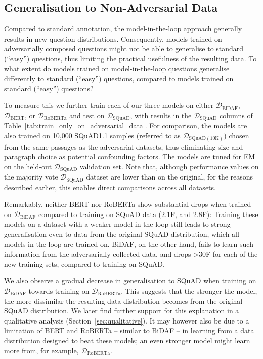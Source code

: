\documentclass[11pt,a4paper]{article}
\newcommand{\dataset}[1]{\ensuremath{\mathcal{D_{\mathrm{#1}}}}}
\newcommand{\squad}{SQuAD}
\newcommand{\squadone}{SQuAD1.1}
\newif\ifpagebreaks
\begin{document}
\subsection{Generalisation to Non-Adversarial Data}
Compared to standard annotation, the model-in-the-loop approach generally results in new question distributions.
Consequently, models trained on adversarially composed questions might not be able to generalise to standard (``easy'') questions, thus limiting the practical usefulness of the resulting data.
To what extent do models trained on model-in-the-loop questions generalise differently to standard (``easy'') questions, compared to models trained on standard (``easy'') questions?


\ifpagebreaks
    \pagebreak
\fi
To measure this we further train each of our three models on either \dataset{BiDAF}, \dataset{BERT}, or \dataset{RoBERTa} and test on \dataset{SQuAD}, with results in the \dataset{SQuAD} columns of Table~\ref{tab:train_only_on_adversarial_data}.
For comparison, the models are also trained on 10,000 \squadone{} samples (referred to as \dataset{SQuAD(10K)}) chosen from the same passages as the adversarial datasets, thus eliminating size and paragraph choice as potential confounding factors.
The models are tuned for EM on the held-out \dataset{SQuAD} validation set. 
Note that, although performance values on the majority vote \dataset{SQuAD} dataset are lower than on the original, for the reasons described earlier, this enables direct comparisons across all datasets.


Remarkably, neither BERT nor RoBERTa show substantial drops when trained on \dataset{BiDAF} compared to training on \squad{} data (2.1F, and 2.8F):
Training these models on a dataset with a weaker model in the loop still leads to strong generalisation even to data from the original \squad{} distribution, which all models in the loop are trained on.
BiDAF, on the other hand, fails to learn such information from the adversarially collected data, and drops >30F for each of the new training sets, compared to training on \squad{}.

We also observe a gradual decrease in generalisation to \squad{} when training on \dataset{BiDAF} towards training on \dataset{RoBERTa}.
This suggests that the stronger the model, the more dissimilar the resulting data distribution becomes from the original \squad{} distribution.
We later find further support for this explanation in a qualitative analysis (Section~\ref{sec:qualitative}).
It may however also be due to a limitation of BERT and RoBERTa -- similar to BiDAF -- in learning from a data distribution designed to beat these models; an even stronger model might learn more from, for example, \dataset{RoBERTa}.
\end{document}
